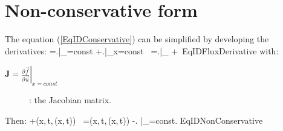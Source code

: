 \section{Non-conservative form}

The equation (\ref{EqIDConservative}) can be simplified by developing the
derivatives:
\EQ
{
	=\left.\right|_{=const}
	+\left.\right|_{x=const}
	\,
	=\left.\right|_{}
	+\,
}{EqIDFluxDerivative}
with:
\begin{description}
	\item[$\mathbf{J}
		=\left.\frac{\partial\vec{f}}{\partial\vec{u}}\right|_{x=const}$]: the
		Jacobian matrix.
\end{description}
Then:
\EQ
{
	+\left(x,\,t,\,(x,\,t)\right)
	\,
	=\left(x,\,t,\,(x,\,t)\right)
	-\left.
	\right|_{=const}.
}{EqIDNonConservative}
